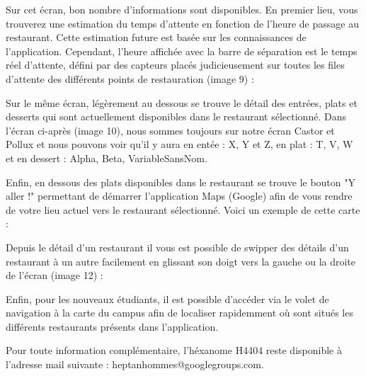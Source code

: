 Sur cet écran, bon nombre d’informations sont disponibles. En premier lieu,
vous trouverez une estimation du temps d’attente en fonction de l’heure de
passage au restaurant. Cette estimation future est basée sur les connaissances
de l’application. Cependant, l’heure affichée avec la barre de séparation est le
temps réel d’attente, défini par des capteurs placés judicieusement sur toutes
les files d’attente des différents points de restauration (image 9) : 

Sur le même écran, légèrement au dessous se trouve le détail des entrées,
plats et desserts qui sont actuellement disponibles dans le restaurant
sélectionné. Dans l’écran ci-après (image 10), nous sommes toujours sur
notre écran Castor et Pollux et nous pouvons voir qu’il y aura en entée : 
X, Y et Z, en plat : T, V, W et en dessert : Alpha, Beta, VariableSansNom. 

Enfin, en dessous des plats disponibles dans le restaurant se trouve le
bouton "Y aller !" permettant de démarrer l’application Maps (Google) afin de
vous rendre de votre lieu actuel vers le restaurant sélectionné. Voici un exemple
de cette carte :

Depuis le détail d’un restaurant il vous est possible de swipper des 
détails d’un restaurant à un autre facilement en glissant son doigt vers la
gauche ou la droite de l’écran (image 12) : 

Enfin, pour les nouveaux étudiants, il est possible d'accéder via le volet de navigation
à la carte du campus afin de localiser rapidemment où sont situés les différents
restaurants présents dans l'application.

Pour toute information complémentaire, l’héxanome H4404 reste disponible
à l’adresse mail suivante : heptanhommes@googlegroups.com. 